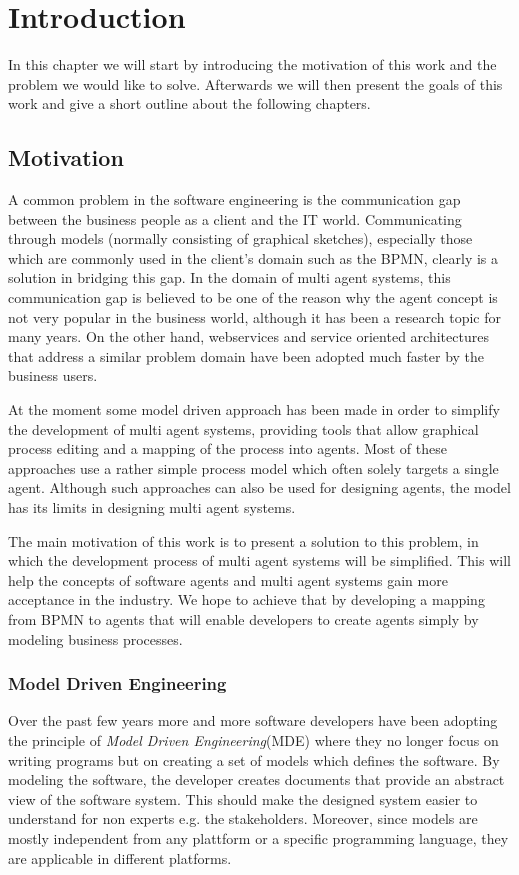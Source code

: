 \chapter{Introduction}

In this chapter we will start by introducing the motivation of this work and the problem we would like to solve. Afterwards we will then present the goals of this work and give a short outline about the following chapters.
\section{Motivation}
\label{sec:Motivation}
A common problem in the software engineering is the communication gap between the business people as a client and the IT world.  Communicating through models (normally consisting of graphical sketches), especially those which are commonly used in the client's domain such as the BPMN, clearly is a solution in bridging this gap. In the domain of multi agent systems, this communication gap is believed to be one of the reason why the agent concept is not very popular in the business world, although it has been a research topic for many years. On the other hand, webservices and service oriented architectures that address a similar problem domain have been adopted much faster by the business users.

At the moment some model driven approach has been made in order to simplify the development of multi agent systems, providing tools that allow graphical process editing and a mapping of the process into agents. Most of these approaches use a rather simple process model which often solely targets a single agent. Although such approaches can also be used for designing agents, the model has its limits in designing multi agent systems. 
  
The main motivation of this work is to present a solution to this problem, in which the development process of multi agent systems will be simplified. This will help  the concepts of software agents and multi agent systems gain more acceptance in the industry. We hope to achieve that by developing a mapping from BPMN to agents that will enable developers to create agents simply by modeling business processes.\\

\subsection{Model Driven Engineering}
Over the past few years more and more software developers have been adopting the principle of \textit{Model Driven Engineering}(MDE) where 
they no longer focus on writing programs but on creating a set of models which defines the software. By modeling the software, the developer creates documents that provide an abstract view of the software system. This should make the designed system easier to understand for non experts e.g. the stakeholders. Moreover, since models are mostly independent from any plattform or a specific programming language, they are applicable in different platforms. 

